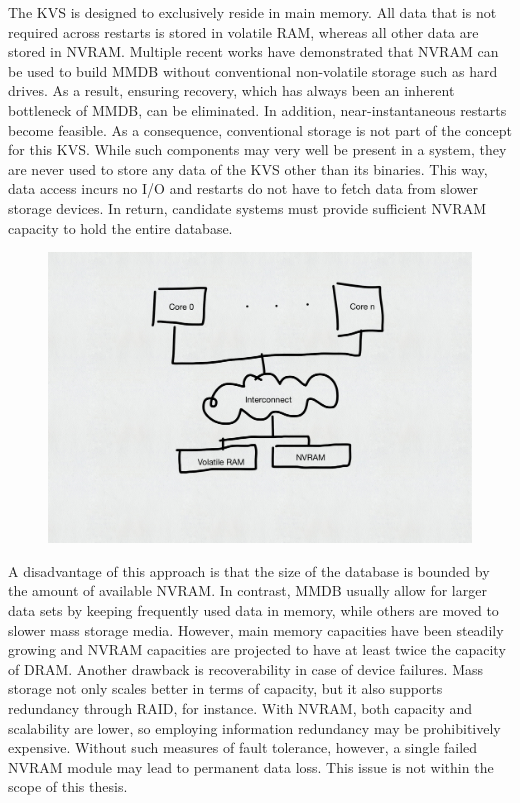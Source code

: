 The \ac{KVS} is designed to exclusively reside in main memory. All data that is
not required across restarts is stored in volatile \ac{RAM}, whereas all other
data are stored in \ac{NVRAM}. Multiple recent works have demonstrated that
\ac{NVRAM} can be used to build \ac{MMDB} without conventional non-volatile
storage such as hard drives. As a result, ensuring recovery, which has always
been an inherent bottleneck of \ac{MMDB}, can be eliminated. In addition,
near-instantaneous restarts become feasible. As a consequence, conventional
storage is not part of the concept for this \ac{KVS}. While such components may
very well be present in a system, they are never used to store any data of the
\ac{KVS} other than its binaries. This way, data access incurs no I/O and
restarts do not have to fetch data from slower storage devices. In return,
candidate systems must provide sufficient \ac{NVRAM} capacity to hold the entire
database.

\begin{figure}[h!]
    \centering
    \includegraphics[scale=0.5]{figures/drafts/concept-sys-mem.pdf}
    \caption{}
    \label{fig:concept-sys-mem}
\end{figure}

A disadvantage of this approach is that the size of the database is bounded by
the amount of available \ac{NVRAM}. In contrast, \ac{MMDB} usually allow for
larger data sets by keeping frequently used data in memory, while others are
moved to slower mass storage media. However, main memory capacities have been
steadily growing and \ac{NVRAM} capacities are projected to have at least twice
the capacity of \ac{DRAM}. Another drawback is recoverability in case of device
failures. Mass storage not only scales better in terms of capacity, but it also
supports redundancy through \ac{RAID}, for instance. With \ac{NVRAM}, both
capacity and scalability are lower, so employing information redundancy may be
prohibitively expensive. Without such measures of fault tolerance, however, a
single failed \ac{NVRAM} module may lead to permanent data loss. This issue is
not within the scope of this thesis.
